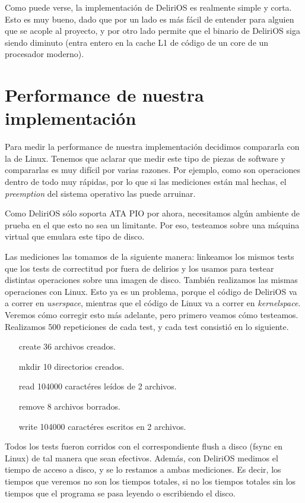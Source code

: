 Como puede verse, la implementación de DeliriOS es realmente simple y corta. Esto es muy bueno, dado que por un lado es más fácil de entender para alguien que se acople al proyecto, y por otro lado permite que el binario de DeliriOS siga siendo diminuto (entra entero en la cache L1 de código de un core de un procesador moderno).



\section{Performance de nuestra implementación}

Para medir la performance de nuestra implementación decidimos compararla con la de Linux.
Tenemos que aclarar que medir este tipo de piezas de software y compararlas es muy difícil por varias razones.
Por ejemplo, como son operaciones dentro de todo muy rápidas, por lo que si las mediciones están mal hechas, el \emph{preemption} del sistema operativo las puede arruinar.

Como DeliriOS sólo soporta ATA PIO por ahora, necesitamos algún ambiente de prueba en el que esto no sea un limitante. Por eso, testeamos sobre una máquina virtual que emulara este tipo de disco.

Las mediciones las tomamos de la siguiente manera: linkeamos los mismos tests que los tests de correctitud por fuera de delirios y los usamos para testear distintas operaciones sobre una imagen de disco.
Tambi\'en realizamos las mismas operaciones con Linux.
Esto ya es un problema, porque el código de DeliriOS va a correr en \emph{userspace}, mientras que el código de Linux va a correr en \emph{kernelspace}.
Veremos cómo corregir esto más adelante, pero primero veamos cómo testeamos. Realizamos 500 repeticiones de cada test, y cada test consistió en lo siguiente.

\begin{itemize}
    \item[create] 36 archivos creados.
    \item[mkdir] 10 directorios creados.
    \item[read] 104000 caract\'eres leídos de 2 archivos.
    \item[remove] 8 archivos borrados.
    \item[write] 104000 caract\'eres escritos en 2 archivos.
\end{itemize}

Todos los tests fueron corridos con el correspondiente flush a disco (fsync en Linux) de tal manera que sean efectivos. Además, con DeliriOS medimos el tiempo de acceso a disco, y se lo restamos a ambas mediciones. Es decir, los tiempos que veremos no son los tiempos totales, si no los tiempos totales sin los tiempos que el programa se pasa leyendo o escribiendo el disco.

